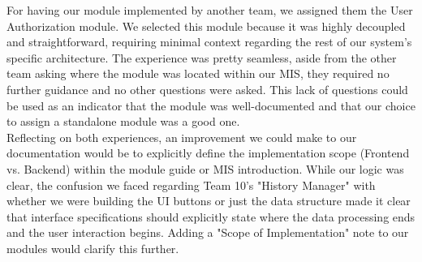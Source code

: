 \documentclass[12pt, titlepage]{article}
\begin{document}
  \noindent For having our module implemented by another team, we assigned them the User Authorization module.
  We selected this module because it was highly decoupled and straightforward, requiring
  minimal context regarding the rest of our system's specific architecture. The experience was
  pretty seamless, aside from the other team asking where the module was located within our
  MIS, they required no further guidance and no other questions were asked. This lack of questions
  could be used as an indicator that the module was well-documented and that our choice to assign
  a standalone module was a good one.\\

  \noindent Reflecting on both experiences, an improvement we could make to our documentation would be to explicitly
  define the implementation scope (Frontend vs. Backend) within the module guide or MIS introduction.
  While our logic was clear, the confusion we faced regarding Team 10's "History Manager" with
  whether we were building the UI buttons or just the data structure made it clear that interface
  specifications should explicitly state where the data processing ends and the user interaction begins.
  Adding a "Scope of Implementation" note to our modules would clarify this further.\\
\end{document}
